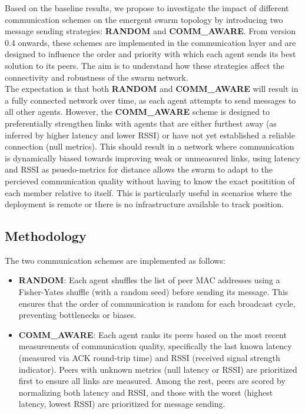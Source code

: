 \documentclass[conference]{IEEEtran}
\begin{document}
Based on the baseline results, we propose to investigate the impact of different communication schemes on the emergent swarm topology by introducing two message sending strategies: \textbf{RANDOM} and \textbf{COMM\_AWARE}. From version 0.4 onwards, these schemes are implemented in the communication layer and are designed to influence the order and priority with which each agent sends its best solution to its peers. The aim is to understand how these strategies affect the connectivity and robustness of the swarm network.\\

The expectation is that both \textbf{RANDOM} and \textbf{COMM\_AWARE} will result in a fully connected network over time, as each agent attempts to send messages to all other agents. However, the \textbf{COMM\_AWARE} scheme is designed to preferentially strengthen links with agents that are either furthest away (as inferred by higher latency and lower RSSI) or have not yet established a reliable connection (null metrics). This should result in a network where communication is dynamically biased towards improving weak or unmeasured links, using latency and RSSI as psuedo-metrics for distance allows the swarm to adapt to the percieved communication quality without having to know the exact positition of each member relative to itself. This is particularly useful in scenarios where the deployment is remote or there is no infrastructure available to track position.\\

\subsection{Methodology}

The two communication schemes are implemented as follows:

\begin{itemize}
    \item \textbf{RANDOM}: Each agent shuffles the list of peer MAC addresses using a Fisher-Yates shuffle (with a random seed) before sending its message. This ensures that the order of communication is random for each broadcast cycle, preventing bottlenecks or biases.
    \item \textbf{COMM\_AWARE}: Each agent ranks its peers based on the most recent measurements of communication quality, specifically the last known latency (measured via ACK round-trip time) and RSSI (received signal strength indicator). Peers with unknown metrics (null latency or RSSI) are prioritized first to ensure all links are measured. Among the rest, peers are scored by normalizing both latency and RSSI, and those with the worst (highest latency, lowest RSSI) are prioritized for message sending.
\end{itemize}
\end{document}
